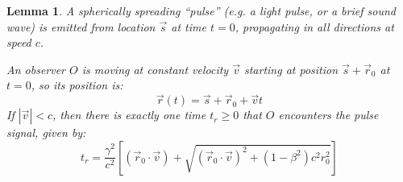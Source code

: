 \documentclass[a4paper]{article}
\theoremstyle{plain}
\newtheorem{lemma}[theorem]{Lemma}
\theoremstyle{definition}
\newcommand{\vect}[1]{\vec{#1}}
\begin{document}
\begin{lemma}
\label{lem:IntersectingSpreadingPulse2}
A spherically spreading ``pulse'' (e.g. a light pulse, or a brief
sound wave) is emitted from location $\vect{s}$ at time $t=0$,
propagating in all directions at speed $c$.

An observer $O$ is moving at constant velocity $\vect{v}$ starting at
position $\vect{s} + \vect{r}_0$ at $t=0$, so its position is:
\begin{equation}
\vect{r}(t) = \vect{s} + \vect{r}_0 + \vect{v}t
\end{equation}
If $|\vect{v}| < c$, then there is exactly one time $t_r \geq 0$ that
$O$ encounters the pulse signal, given by:
\begin{equation}
t_r = \frac{\gamma^2}{c^2} \left[ (\vect{r}_0 \cdot \vect{v}) + \sqrt{(\vect{r}_0 \cdot \vect{v})^2 + (1-\beta^2)c^2 r_0^2} \right]
\end{equation}
\end{lemma}
\end{document}
